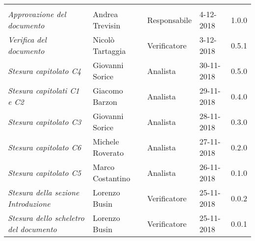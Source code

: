 \newpage 
\section*{}
\begin{table}[H]
	\centering
	\begin{tabular}{p{4cm}|C{3cm}|C{3cm}|R{2.5cm}|R{2cm}}
		
		 & & & & \\
		
		
		\emph{Approvazione del documento} & Andrea Trevisin & Responsabile & 4-12-2018 & 1.0.0 \\
		\hline
		
		\emph{Verifica del documento} & Nicolò Tartaggia & Verificatore & 3-12-2018 & 0.5.1 \\
		\hline
		
		\emph{Stesura capitolato C4 } & Giovanni Sorice & Analista & 30-11-2018 & 0.5.0 \\
		\hline
		
		\emph{Stesura capitolati C1 e C2} & Giacomo Barzon & Analista & 29-11-2018 & 0.4.0 \\
		\hline
		
		\emph{Stesura capitolato C3 } & Giovanni Sorice & Analista & 28-11-2018 & 0.3.0 \\
		\hline
		
		\emph{Stesura capitolato C6 } & Michele Roverato & Analista & 27-11-2018 & 0.2.0 \\
		\hline
		
		\emph{Stesura capitolato C5 } & Marco Costantino & Analista & 26-11-2018 & 0.1.0 \\
		\hline
		
		\emph{Stesura della sezione Introduzione } & Lorenzo Busin & Verificatore & 25-11-2018 & 0.0.2 \\
		\hline
		
		\emph{Stesura dello scheletro del documento} & Lorenzo Busin & Verificatore & 25-11-2018 & 0.0.1 \\
		
	\end{tabular}
	
\end{table}


\clearpage